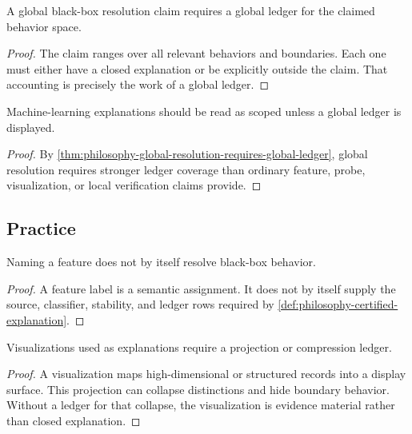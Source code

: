 \begin{theorem}
\label{thm:philosophy-global-resolution-requires-global-ledger}
A global black-box resolution claim requires a global ledger for the
claimed behavior space.
\end{theorem}
\begin{proof}
The claim ranges over all relevant behaviors and boundaries. Each one
must either have a closed explanation or be explicitly outside the
claim. That accounting is precisely the work of a global ledger.
\end{proof}

\begin{corollary}
\label{cor:philosophy-interpretability-claims-scoped-default}
Machine-learning explanations should be read as scoped unless a global
ledger is displayed.
\end{corollary}
\begin{proof}
By \autoref{thm:philosophy-global-resolution-requires-global-ledger},
global resolution requires stronger ledger coverage than ordinary
feature, probe, visualization, or local verification claims provide.
\end{proof}

\subsection{Practice}
\label{subsec:philosophy-black-box-practice}

\begin{theorem}
\label{thm:philosophy-feature-labels-do-not-resolve-black-boxes}
Naming a feature does not by itself resolve black-box behavior.
\end{theorem}
\begin{proof}
A feature label is a semantic assignment. It does not by itself supply
the source, classifier, stability, and ledger rows required by
\autoref{def:philosophy-certified-explanation}.
\end{proof}

\begin{theorem}
\label{thm:philosophy-visual-explanations-require-projection-ledger}
Visualizations used as explanations require a projection or compression
ledger.
\end{theorem}
\begin{proof}
A visualization maps high-dimensional or structured records into a
display surface. This projection can collapse distinctions and hide
boundary behavior. Without a ledger for that collapse, the visualization
is evidence material rather than closed explanation.
\end{proof}

